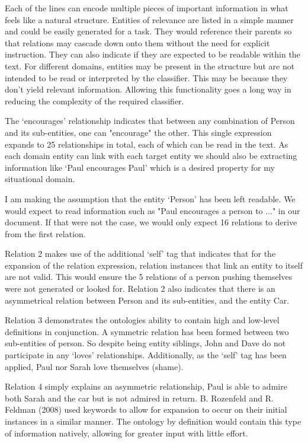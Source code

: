 \documentclass{ecmm427_assignment}
\begin{document}
Each of the lines can encode multiple pieces of important information in what feels like a natural structure. Entities of relevance are listed in a simple manner and could be easily generated for a task. They would reference their parents so that relations may cascade down onto them without the need for explicit instruction. They can also indicate if they are expected to be readable within the text. For different domains, entities may be present in the structure but are not intended to be read or interpreted by the classifier. This may be because they don't yield relevant information. Allowing this functionality goes a long way in reducing the complexity of the required classifier.

The `encourages' relationship indicates that between any combination of Person and its sub-entities, one can "encourage" the other. This single expression expands to 25 relationships in total, each of which can be read in the text. As each domain entity can link with each target entity we should also be extracting information like `Paul encourages Paul' which is a desired property for my situational domain.

I am making the assumption that the entity `Person' has been left readable.  We would expect to read information such as "Paul encourages a person to ..." in our document. If that were not the case, we would only expect 16 relations to derive from the first relation.

Relation 2 makes use of the additional `self' tag that indicates that for the expansion of the relation expression, relation instances that link an entity to itself are not valid. This would ensure the 5 relations of a person pushing themselves were not generated or looked for. Relation 2 also indicates that there is an asymmetrical relation between Person and its sub-entities, and the entity Car. 

Relation 3 demonstrates the ontologies ability to contain high and low-level definitions in conjunction. A symmetric relation has been formed between two sub-entities of person. So despite being entity siblings, John and Dave do not participate in any `loves' relationships. Additionally, as the `self' tag has been applied, Paul nor Sarah love themselves (shame).

Relation 4 simply explains an asymmetric relationship, Paul is able to admire both Sarah and the car but is not admired in return. B. Rozenfeld and R. Feldman (2008) used keywords to allow for expansion to occur on their initial instances in a similar manner. The ontology by definition would contain this type of information natively, allowing for greater input with little effort.\\
\end{document}
